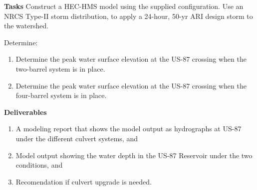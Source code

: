 \documentclass[12pt]{article}
\begin{document}
\begin{enumerate}
\clearpage

\textbf{Tasks}
Construct a HEC-HMS model using the supplied configuration. Use an NRCS Type-II storm distribution, to apply a 24-hour, 50-yr ARI design storm to the watershed.

Determine:
\begin{enumerate}
\item Determine the peak water surface elevation at the US-87 crossing when the two-barrel system is in place.
\item Determine the peak water surface elevation at the US-87 crossing when the four-barrel system is in place.
\end{enumerate}

\textbf{Deliverables}
\begin{enumerate}
\item A modeling report that shows the model output as hydrographs at US-87 under the different culvert systems, and
\item Model output showing the water depth in the US-87 Reservoir under the two conditions, and
\item Recomendation if culvert upgrade is needed.
\end{enumerate}

\end{enumerate}

\clearpage
\end{document}
